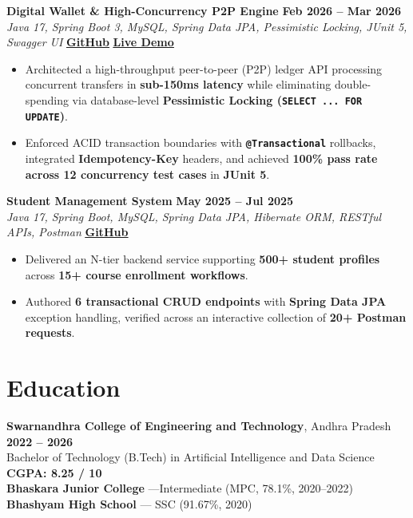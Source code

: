 \documentclass[a4paper,10pt]{article}
\begin{document}
\noindent
\textbf{Digital Wallet \& High-Concurrency P2P Engine} \hfill \textbf{Feb 2026 -- Mar 2026}\\
\textit{Java 17, Spring Boot 3, MySQL, Spring Data JPA, Pessimistic Locking, JUnit 5, Swagger UI} \hfill
\href{https://github.com/Rohith-04-04/digital-wallet-backend}{\textbf{\underline{GitHub}}} \;\textbar\;
\href{https://digital-wallet-backend-p7cx.onrender.com/swagger-ui/index.html}{\textbf{\underline{Live Demo}}}
\begin{itemize}
    \item Architected a high-throughput peer-to-peer (P2P) ledger API processing concurrent transfers in \textbf{sub-150ms latency} while eliminating double-spending via database-level \textbf{Pessimistic Locking (\texttt{SELECT ... FOR UPDATE})}.
    \item Enforced ACID transaction boundaries with \textbf{\texttt{@Transactional}} rollbacks, integrated \textbf{Idempotency-Key} headers, and achieved \textbf{100\% pass rate across 12 concurrency test cases} in \textbf{JUnit 5}.
\end{itemize}

\vspace{2pt}

\noindent
\textbf{Student Management System} \hfill \textbf{May 2025 -- Jul 2025}\\
\textit{Java 17, Spring Boot, MySQL, Spring Data JPA, Hibernate ORM, RESTful APIs, Postman} \hfill
\href{https://github.com/Rohith-04-04/Student-Management-System}{\textbf{\underline{GitHub}}}
\begin{itemize}
    \item Delivered an N-tier backend service supporting \textbf{500+ student profiles} across \textbf{15+ course enrollment workflows}.
    \item Authored \textbf{6 transactional CRUD endpoints} with \textbf{Spring Data JPA} exception handling, verified across an interactive collection of \textbf{20+ Postman requests}.
\end{itemize}

\vspace{1pt}

\section*{Education}
\noindent
\textbf{Swarnandhra College of Engineering and Technology}, Andhra Pradesh \hfill \textbf{2022 -- 2026}\\
Bachelor of Technology (B.Tech) in Artificial Intelligence and Data Science \hfill \textbf{CGPA: 8.25 / 10}\\
\vspace{0.5pt}
\textbf{Bhaskara Junior College} ---\hfill Intermediate (MPC, 78.1\%, 2020--2022) \\ 
\vspace{0.5pt}
\textbf{Bhashyam High School} --- \hfill SSC (91.67\%, 2020)
\end{document}
